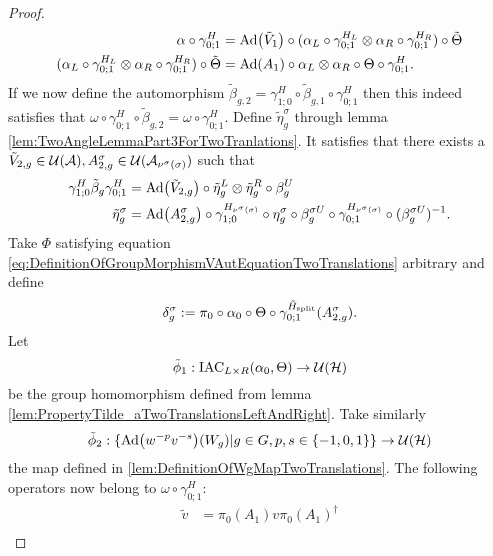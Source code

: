 \documentclass[11pt,a4paper,twoside]{article}
\numberwithin{equation}{section}
\begin{document}
\begin{proof}
	\begin{align}
		\alpha\circ\gamma^H_{0;1}&=\Ad{\tilde V_1}\circ(\alpha_L\circ\gamma^{H_L}_{0;1}\otimes\alpha_R\circ\gamma^{H_R}_{0;1})\circ\tilde\Theta\\
		(\alpha_L\circ\gamma^{H_L}_{0;1}\otimes\alpha_R\circ\gamma^{H_R}_{0;1})\circ\tilde\Theta&=\Ad{A_1}\circ \alpha_L\otimes\alpha_R\circ\Theta\circ\gamma^{H}_{0;1}.
	\end{align}
	If we now define the automorphism $\tilde{\beta}_{g,2}=\gamma^{H}_{1;0}\circ\tilde\beta_{g,1}\circ\gamma^{H}_{0;1}$ then this indeed satisfies that $\omega\circ\gamma^{H}_{0;1}\circ\tilde{\beta}_{g,2}=\omega\circ\gamma^{H}_{0;1}$. Define $\tilde\eta_g^\sigma$ through lemma \ref{lem:TwoAngleLemmaPart3ForTwoTranlations}. It satisfies that there exists a $\tilde V_{2,g}\in\mathcal U(\mathcal A),A_{2,g}^{\sigma}\in\mathcal U(\mathcal A_{\nu^{\sigma}(\sigma)})$ such that
	\begin{align}
		\label{eq:IndexInvariantUnderLGAEtaTildeDefiniton1TwoTrans}
		\gamma^{H}_{1;0}\tilde{\beta}_g\gamma^{H}_{0;1}&=\Ad{\tilde V_{2,g}}\circ\tilde{\eta}_g^L\otimes\tilde{\eta}_g^R\circ\beta_g^U\\
		\label{eq:IndexInvariantUnderLGAEtaTildeDefiniton2TwoTrans}
		\tilde{\eta}_g^\sigma&=\Ad{A_{2,g}^\sigma}\circ\gamma^{H_{\nu^{\sigma}(\sigma)}}_{1;0}\circ\eta_g^\sigma\circ\beta_g^{\sigma U}\circ\gamma^{H_{\nu^{\sigma}(\sigma)}}_{0;1}\circ(\beta_g^{\sigma U})^{-1}.
	\end{align}
	Take $\Phi$ satisfying equation \ref{eq:DefinitionOfGroupMorphismVAutEquationTwoTranslations} arbitrary and define 
	\begin{equation}
		\delta_g^\sigma:=\pi_0\circ\alpha_0\circ\Theta\circ\gamma^{{\tilde{H}_{\text{split}}}}_{0;1}(A_{2,g}^\sigma).
	\end{equation}
	Let
	\begin{equation}
		\tilde{\phi}_1:\textrm{IAC}_{L\times R}(\alpha_0,\Theta) \rightarrow \mathcal U(\mathcal H)
	\end{equation}
	be the group homomorphism defined from lemma \ref{lem:PropertyTilde_aTwoTranslationsLeftAndRight}. Take similarly
	\begin{equation}
		\phiTilde_2:\{\Ad{w^{-p}v^{-s}}(W_g)|g\in G,p,s\in\{-1,0,1\}\}\rightarrow \UU(\HH)
	\end{equation}
	the map defined in \ref{lem:DefinitionOfWgMapTwoTranslations}. The following operators now belong to $\omega\circ\gamma^{H}_{0;1}:$
	\begin{align}
		\tilde{v}&=\pi_0(A_1)v\pi_0(A_1)^\dagger\\

\end{align}
\end{proof}
\end{document}
